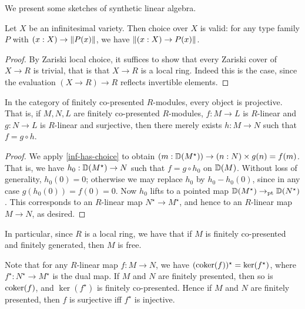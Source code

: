 We present some sketches of synthetic linear algebra.

\begin{lemma}\label{inf-has-choice}
Let $X$ be an infinitesimal variety. Then choice over $X$ is valid:
for any type family $P$ with $(x : X) \to \lVert P(x) \rVert$,
we have $\lVert (x : X) \to P(x) \rVert$.
\end{lemma}
\begin{proof}
By Zariski local choice, it suffices to show that every Zariski cover
of $X \to R$ is trivial, that is that $X \to R$ is a local ring.
Indeed this is the case, since the evaluation $(X \to R) \to R$
reflects invertible elements.
\end{proof}

\begin{lemma}
In the category of finitely co-presented $R$-modules, every object is projective.
That is, if $M,N,L$ are finitely co-presented $R$-modules,
$f : M \to L$ is $R$-linear and $g : N \to L$ is $R$-linear and surjective,
then there merely exists $h : M \to N$ such that $f = g \circ h$.
\end{lemma}
\begin{proof}
We apply \cref{inf-has-choice} to obtain
$(m : \mathbb{D}(M^\star)) \to (n : N) \times g(n) = f(m)$.
That is, we have $h_0 : \mathbb{D}(M^\star) \to N$ such that $f = g \circ h_0$ on $\mathbb{D}(M)$.
Without loss of generality, $h_0(0) = 0$; otherwise we may replace $h_0$
by $h_0 - h_0(0)$, since in any case $g(h_0(0)) = f(0) = 0$.
Now $h_0$ lifts to a pointed map $\mathbb{D}(M^\star) \to_{\mathrm{pt}} \mathbb{D}(N^\star)$.
This corresponds to an $R$-linear map $N^\star \to M^\star$, and hence to
an $R$-linear map $M \to N$, as desired.
\end{proof}

In particular, since $R$ is a local ring, we have that if $M$ is finitely 
co-presented and finitely generated, then $M$ is free.

Note that for any $R$-linear map $f : M \to N$, we have
$(\operatorname{coker}(f))^\star = \ker(f^\star)$, where $f^\star : N^\star \to M^\star$ is
the dual map.
If $M$ and $N$ are finitely presented, then
so is $\operatorname{coker}(f)$,
and $\ker(f^\star)$ is finitely co-presented.
Hence if $M$ and $N$ are finitely presented, then 
$f$ is surjective iff $f^\star$ is injective.

